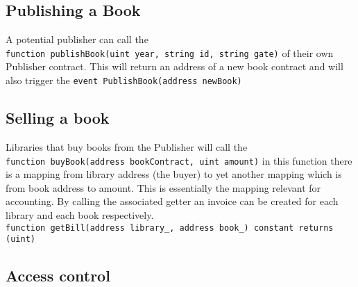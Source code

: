 \subsection{Publishing a Book}
A potential publisher can call the\\ 
 \verb|function publishBook(uint year, string id, string gate)| of their own Publisher contract. This will return an address of a new book contract and will also trigger the 
 \verb|event PublishBook(address newBook)|
\subsection{Selling a book}
Libraries that buy books from the Publisher will call the \\
\verb|function buyBook(address bookContract, uint amount)|  in this function there is a mapping from library address (the buyer) to yet another mapping which is from book address to amount. This is essentially the mapping relevant for accounting. By calling the associated getter an invoice can be created for each library and each book respectively.\\
 \verb|function getBill(address library_, address book_) constant returns (uint)|
\subsection{Access control}


